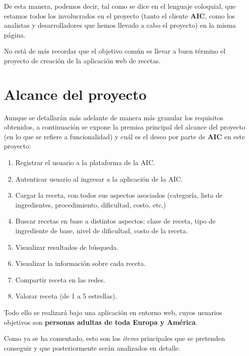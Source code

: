 \documentclass{\ClassPath/viu-tfm-template}
\begin{document}
De esta manera, podemos decir, tal como se dice en el lenguaje coloquial, que estamos todos los involucrados en el proyecto (tanto el cliente \textbf{AIC}, como los analistas y desarrolladores que hemos llevado a cabo el proyecto) en la misma página.

No está de más recordar que el objetivo común es llevar a buen término el proyecto de creación de la aplicación web de recetas.

\section{Alcance del proyecto}
Aunque se detallarán más adelante de manera más granular los requisitos obtenidos, a continuación se expone la premisa principal del alcance del proyecto (en lo que se refiere a funcionalidad) y cuál es el deseo por parte de \textbf{AIC} en este proyecto:

\begin{enumerate}[label=\alph*)]
    \item Registrar el usuario a la plataforma de la AIC.
    \item Autenticar usuario al ingresar a la aplicación de la AIC.
    \item Cargar la receta, con todos sus aspectos asociados (categoría, lista de
    ingredientes, procedimiento, dificultad, costo, etc.)
    \item Buscar recetas en base a distintos aspectos: clase de receta, tipo de ingrediente
    de base, nivel de dificultad, costo de la receta.
    \item Visualizar resultados de búsqueda.
    \item Visualizar la información sobre cada receta.
    \item Compartir receta en las redes.
    \item Valorar receta (de 1 a 5 estrellas).
\end{enumerate}

Todo ello se realizará bajo una aplicación en entorno web, cuyos usuarios objetivos son \textbf{personas adultas de toda Europa y América}.


Como ya se ha comentado, esto son los \textit{items} principales que se pretenden conseguir y que posteriormente serán analizados en detalle.


\end{document}
